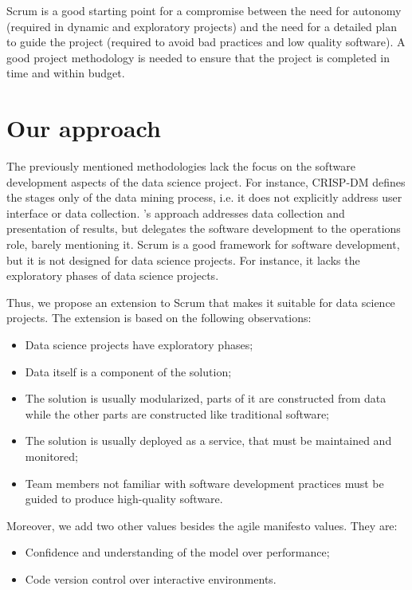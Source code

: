 Scrum is a good starting point for a compromise between the need for autonomy (required in
dynamic and exploratory projects) and the need for a detailed plan to guide the project
(required to avoid bad practices and low quality software). A good project methodology is
needed to ensure that the project is completed in time and within budget.

\section{Our approach}

The previously mentioned methodologies lack the focus on the software development aspects of
the data science project.  For instance, CRISP-DM defines the stages only of the data
mining process, i.e. it does not explicitly address user interface or data collection.
\citeauthor{Zumel2019}'s approach addresses data collection and presentation of results, but
delegates the software development to the operations role, barely mentioning it.  Scrum is
a good framework for software development, but it is not designed for data science
projects.  For instance, it lacks the exploratory phases of data science projects.

Thus, we propose an extension to Scrum that makes it suitable for data science projects.
The extension is based on the following observations:
\begin{itemize}
  \itemsep0em
  \item Data science projects have exploratory phases;
  \item Data itself is a component of the solution;
  \item The solution is usually modularized, parts of it are constructed from data while the
    other parts are constructed like traditional software;
  \item The solution is usually deployed as a service, that must be maintained and
    monitored;
  \item Team members not familiar with software development practices must be guided to
    produce high-quality software.
\end{itemize}

Moreover, we add two other values besides the agile manifesto values.  They are:
\begin{itemize}
  \itemsep0em
  \item Confidence and understanding of the model over performance;
  \item Code version control over interactive environments.
\end{itemize}

